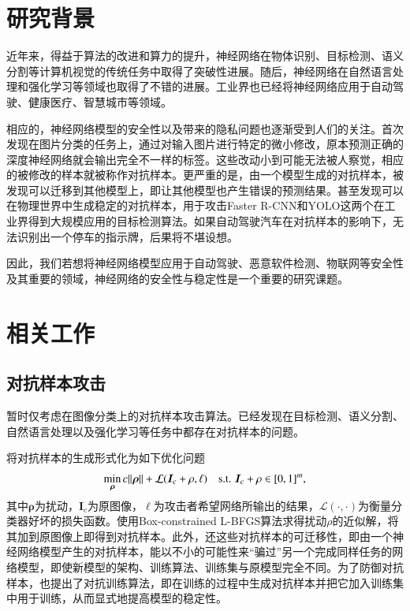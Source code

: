 
\chapter{研究背景}

	近年来，得益于算法的改进和算力的提升，神经网络在物体识别\cite{NIPS2012_4824}、目标检测\cite{girshick15fastrcnn}、语义分割\cite{Long_2015_CVPR}等计算机视觉的传统任务中取得了突破性进展。随后，神经网络在自然语言处理\cite{NIPS2014_5346}和强化学习\cite{44806}等领域也取得了不错的进展。工业界也已经将神经网络应用于自动驾驶、健康医疗、智慧城市等领域。
	
	相应的，神经网络模型的安全性以及带来的隐私问题也逐渐受到人们的关注。\citet{szegedy2014intriguing}首次发现在图片分类的任务上，通过对输入图片进行特定的微小修改，原本预测正确的深度神经网络就会输出完全不一样的标签。这些改动小到可能无法被人察觉\cite{carlini2017towards}，相应的被修改的样本就被称作对抗样本。更严重的是，由一个模型生成的对抗样本，被发现可以迁移到其他模型上，即让其他模型也产生错误的预测结果。\citet{sinha2018certifiable}甚至发现可以在物理世界中生成稳定的对抗样本，用于攻击Faster R-CNN\cite{NIPS2015_5638}和YOLO\cite{Redmon_2016_CVPR}这两个在工业界得到大规模应用的目标检测算法。如果自动驾驶汽车在对抗样本的影响下，无法识别出一个停车的指示牌，后果将不堪设想。
	
	因此，我们若想将神经网络模型应用于自动驾驶、恶意软件检测、物联网等安全性及其重要的领域，神经网络的安全性与稳定性是一个重要的研究课题。

\vspace{\baselineskip}
{\let\clearpage\relax \chapter{相关工作}}
\section{对抗样本攻击}
暂时仅考虑在图像分类上的对抗样本攻击算法。已经发现在目标检测、语义分割、自然语言处理以及强化学习等任务中都存在对抗样本的问题。

\citet{szegedy2014intriguing}将对抗样本的生成形式化为如下优化问题
\begin{align}
\min_{\bm{\rho}} c\lVert \bm{\rho} \rVert + \mathcal{L}(\bm{I}_c + \rho, \ell) \text{\quad s.t. } \bm{I}_c + \rho \in [0,1]^m,
\end{align}
其中$\bm{\rho}$为扰动，$\bm{I}_c$为原图像，$\ell$为攻击者希望网络所输出的结果，$\bm{\mathcal{L}}(\cdot , \cdot)$为衡量分类器好坏的损失函数。\citet{szegedy2014intriguing}使用Box-constrained L-BFGS算法求得扰动$\rho$的近似解，将其加到原图像上即得到对抗样本。此外，\citet{szegedy2014intriguing}还这些对抗样本的可迁移性，即由一个神经网络模型产生的对抗样本，能以不小的可能性来“骗过”另一个完成同样任务的网络模型，即使新模型的架构、训练算法、训练集与原模型完全不同。为了防御对抗样本，\citet{szegedy2014intriguing}也提出了对抗训练算法，即在训练的过程中生成对抗样本并把它加入训练集中用于训练，从而显式地提高模型的稳定性。

